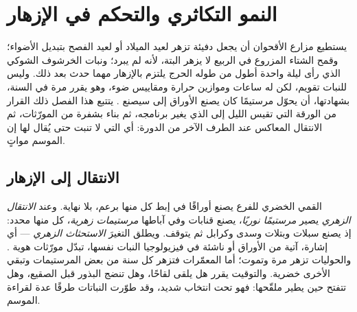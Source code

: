 \chapter{النمو التكاثري والتحكم في الإزهار}\label{ch:b2:plant-flowering}

يستطيع مزارع الأقحوان أن يجعل دفيئة تزهر لعيد الميلاد
أو لعيد الفصح بتبديل الأضواء؛ وقمح الشتاء المزروع في
الربيع لا يزهر البتة، لأنه لم يبرد؛ ونبات الخرشوف الشوكي
الذي رأى ليلة واحدة أطول من طوله الحرج
يلتزم بالإزهار مهما حدث بعد ذلك. وليس للنبات تقويم،
لكن له ساعات وموازين حرارة ومقاييس ضوء، وهو يقرر مرة في
السنة، بشهادتها، أن يحوّل مرستيمًا كان يصنع الأوراق إلى
 سيصنع . يتتبع هذا الفصل ذلك القرار
من الورقة التي تقيس الليل إلى  الذي يغير برنامجه، ثم
بناء  بشفرة من المورّثات، ثم الانتقال
المعاكس عند الطرف الآخر من الدورة: أي  التي لا
تنبت حتى يُقال لها إن الموسم مواتٍ.

\section{الانتقال إلى الإزهار}

\begin{definition}\label{def:b2:plant-flowering:transition}
 القمي الخضري للفرع يصنع أوراقًا في إبط كل منها برعم،
بلا نهاية. وعند \emph{الانتقال الزهري} يصير
\emph{مرستيمًا نوريًا}، يصنع قنابات وفي آباطها
\emph{مرستيمات زهرية}، كل منها محدد: إذ
يصنع سبلات وبتلات وسدى وكرابل ثم يتوقف. ويطلق التغيرَ
\emph{الاستحثاث الزهري} --- أي إشارة، آتية من
الأوراق أو ناشئة في فيزيولوجيا النبات نفسها، تبدّل مورّثات
هوية . والحوليات تزهر مرة وتموت؛ أما
المعمّرات فتزهر كل سنة من بعض المرستيمات وتبقي الأخرى
خضرية. والتوقيت يقرر هل يلقى  لقاحًا، وهل تنضج
البذور قبل الصقيع، وهل تتفتح  حين يطير ملقّحها:
فهو تحت انتخاب شديد، وقد طوّرت النباتات طرقًا عدة
لقراءة الموسم.
\end{definition}

